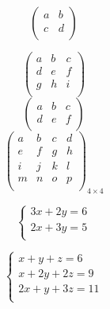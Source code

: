 \documentclass[a4paper, 12pt]{article}
\begin{document}
\vspace{0.5cm}

\begin{equation}
\left(
\begin{array}{lr}
	a & b \\
	c & d \\
\end{array}
\right)
\end{equation}

\vspace{0.5cm}

\begin{equation}
\left(
\begin{array}{lcr}
	a & b & c \\
	d & e & f \\
	g & h & i \\
\end{array}
\right)
\end{equation}
\vspace{0.5cm}
\begin{equation}
\begin{pmatrix}
a & b & c \\
d & e & f \\
\end{pmatrix}
\end{equation}
\vspace{0.5cm}
\begin{equation}
\begin{pmatrix}
a & b & c & d \\
e & f & g & h \\
i & j & k & l \\
m & n & o & p \\
\end{pmatrix}_{4 \times 4}
\end{equation}

\vspace{0.5cm}

\begin{equation}
	\left\lbrace
	\begin{array}{cc}
		3x + 2y = 6 \\
		2x + 3y = 5 \\
	\end{array}
	\right.
\end{equation}

\vspace{0.5cm}

\begin{equation}
	\left\lbrace
	\begin{array}{ccc}
		x + y + z = 6\\
		x + 2y + 2z = 9\\
		2x + y + 3z = 11\\
	\end{array}
	\right.
\end{equation}
\end{document}
